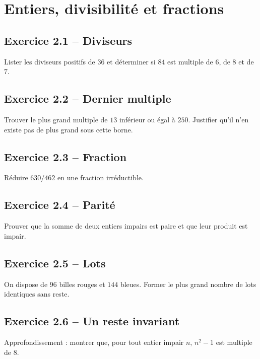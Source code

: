 \chapter{Entiers, divisibilité et fractions}
\section*{Exercice 2.1 -- Diviseurs}
Lister les diviseurs positifs de $36$ et déterminer si $84$ est multiple de $6$, de $8$ et de $7$.

\section*{Exercice 2.2 -- Dernier multiple}
Trouver le plus grand multiple de $13$ inférieur ou égal à $250$. Justifier qu'il n'en existe pas de plus grand sous cette borne.

\section*{Exercice 2.3 -- Fraction}
Réduire $630/462$ en une fraction irréductible.

\section*{Exercice 2.4 -- Parité}
Prouver que la somme de deux entiers impairs est paire et que leur produit est impair.

\section*{Exercice 2.5 -- Lots}
On dispose de $96$ billes rouges et $144$ bleues. Former le plus grand nombre de lots identiques sans reste.

\section*{Exercice 2.6 -- Un reste invariant}
Approfondissement : montrer que, pour tout entier impair $n$, $n^2-1$ est multiple de $8$.

